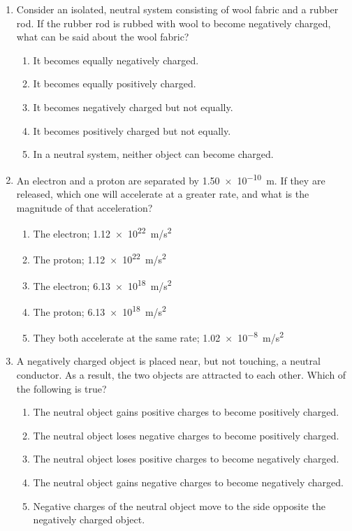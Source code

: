 \documentclass{../../../oss-classkick}
\begin{document}
\begin{multicols*}{2}
\begin{enumerate}[leftmargin=18pt]
  \item Consider an isolated, neutral system consisting of wool fabric and a
    rubber rod. If the rubber rod is rubbed with wool to become negatively
    charged, what can be said about the wool fabric?
    \begin{enumerate}[nosep,leftmargin=18pt,label=(\Alph*)]
    \item It becomes equally negatively charged.
    \item It becomes equally positively charged.
    \item It becomes negatively charged but not equally.
    \item It becomes positively charged but not equally.
    \item In a neutral system, neither object can become charged.
    \end{enumerate}
    \vspace{.7in}
    
  \item An electron and a proton are separated by \SI{1.50e-10}{m}. If they are
    released, which one will accelerate at a greater rate, and what is the
    magnitude of that acceleration?
    \begin{enumerate}[nosep,leftmargin=18pt,label=(\Alph*)]
    \item The electron; \SI{1.12e22}{m/s^2}
    \item The proton; \SI{1.12e22}{m/s^2}
    \item The electron; \SI{6.13e18}{m/s^2}
    \item The proton; \SI{6.13e18}{m/s^2}
    \item They both accelerate at the same rate; \SI{1.02e-8}{m/s^2}
    \end{enumerate}
    \vspace{.7in}
    \columnbreak
    
  \item A negatively charged object is placed near, but not touching, a neutral
    conductor. As a result, the two objects are attracted to each other. Which
    of the following is true?
    \begin{enumerate}[nosep,leftmargin=18pt,label=(\Alph*)]
    \item The neutral object gains positive charges to become positively
      charged.
    \item The neutral object loses negative charges to become positively charged.
    \item The neutral object loses positive charges to become negatively
      charged.
    \item The neutral object gains negative charges to become negatively
      charged.
    \item Negative charges of the neutral object move to the side opposite
      the negatively charged object.
    \end{enumerate}
    \vspace{.7in}
    

\end{enumerate}
\end{multicols*}
\end{document}
